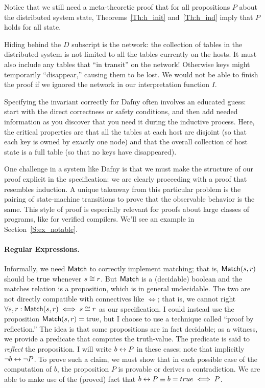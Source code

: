 Notice that we still need a meta-theoretic proof that for all propositions \(P\)
about the distributed system state, Theorems~\ref{Th:h_init} and~\ref{Th:h_ind}
imply that \(P\) holds for all state.

\begin{rem}
    Hiding behind the \(D\) subscript is the network: the collection of tables
    in the distributed system is not limited to all the tables currently on the
    hosts. It must also include any tables that ``in transit'' on the network!
    Otherwise keys might temporarily ``disappear,'' causing them to be lost. We
    would not be able to finish the proof if we ignored the network in our
    interpretation function \(I\).
\end{rem}

Specifying the invariant correctly for Dafny often involves an educated guess:
start with the direct correctness or safety conditions, and then add needed
information as you discover that you need it during the inductive process. Here,
the critical properties are that all the tables at each host are disjoint (so
that each key is owned by exactly one node) and that the overall collection of
host state is a full table (so that no keys have disappeared).

One challenge in a system like Dafny is that we must make the structure of our
proof explicit in the specification: we are clearly proceeding with a proof that
resembles induction. A unique takeaway from this particular problem is the
pairing of state-machine transitions to prove that the observable behavior is
the same. This style of proof is especially relevant for proofs about large
classes of programs, like for verified compilers. We'll see an example in
Section~\ref{S:ex_notable}.

\paragraph{Regular Expressions.} Informally, we need \(\mathsf{Match}\) to
correctly implement matching; that is, \(\mathsf{Match}(s, r)\) should be
\(\operatorname{true}\) whenever \(s \mathrel{\cong} r\). But \(\mathsf{Match}\) is a (decidable)
boolean and the matches relation is a proposition, which is in general
undecidable. The two are not directly compatible with connectives like \(\iff\);
that is, we cannot right \(\forall s, r: \mathsf{Match}(s, r) \iff s \mathrel{\cong} r\)
as our specification. I could instead use the proposition \(\mathsf{Match}(s,
r) = \operatorname{true}\), but I choose to use a technique called ``proof by
reflection.'' The idea is that some propositions are in fact decidable; as a
witness, we provide a predicate that computes the truth-value. The predicate is
said to \emph{reflect} the proposition. I will write \(b \mathrel{\leftrightarrow} P\) in these
cases; note that implicitly \(\neg b \mathrel{\leftrightarrow} \neg P\). To prove such a claim,
we must show that in each possible case of the computation of \(b\), the
proposition \(P\) is provable or derives a contradiction. We are able to make
use of the (proved) fact that \(b \mathrel{\leftrightarrow} P \equiv b = true \iff P\).

